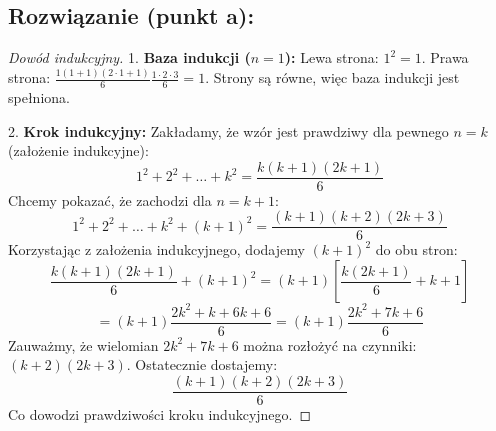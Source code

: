 \documentclass[11pt,a4paper]{article}
\theoremstyle{definition}
\begin{document}
\subsection*{Rozwiązanie (punkt a):}
\begin{proof}[Dowód indukcyjny]
1. \textbf{Baza indukcji ($n = 1$):}
Lewa strona: $1^2 = 1$.
Prawa strona: $\frac{1(1+1)(2\cdot 1+1)}{6} \frac{1 \cdot 2 \cdot 3}{6} = 1$.
Strony są równe, więc baza indukcji jest spełniona.

2. \textbf{Krok indukcyjny:}
Zakładamy, że wzór jest prawdziwy dla pewnego $n = k$ (założenie indukcyjne):
\[ 1^2 + 2^2 + \ldots + k^2 = \frac{k(k+1)(2k+1)}{6} \]
Chcemy pokazać, że zachodzi dla $n = k+1$:
\[ 1^2 + 2^2 + \ldots + k^2 + (k+1)^2 = \frac{(k+1)(k+2)(2k+3)}{6} \]
Korzystając z założenia indukcyjnego, dodajemy $(k+1)^2$ do obu stron:
\[ \frac{k(k+1)(2k+1)}{6} + (k+1)^2 = (k+1) \left[ \frac{k(2k+1)}{6} + k + 1 \right] \]
\[ = (k+1) \frac{2k^2 + k + 6k + 6}{6} = (k+1) \frac{2k^2 + 7k + 6}{6} \]
Zauważmy, że wielomian $2k^2 + 7k + 6$ można rozłożyć na czynniki: $(k+2)(2k+3)$. Ostatecznie dostajemy:
\[ \frac{(k+1)(k+2)(2k+3)}{6} \]
Co dowodzi prawdziwości kroku indukcyjnego.
\end{proof}
\end{document}
